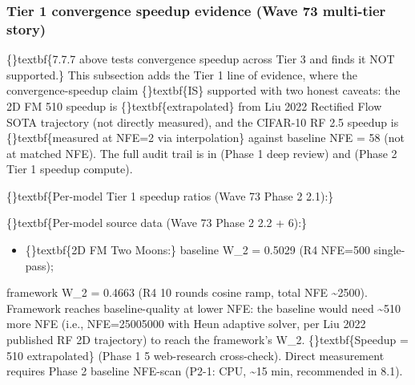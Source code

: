 \documentclass{article}
\begin{document}
\subsubsection{Tier 1 convergence speedup evidence (Wave 73  multi-tier story)}
\{\}textbf\{7.7.7 above tests convergence speedup across Tier 3 and finds it NOT supported.\} This subsection adds the Tier 1 line of evidence, where the convergence-speedup claim \{\}textbf\{IS\} supported  with two honest caveats: the 2D FM 510 speedup is \{\}textbf\{extrapolated\} from Liu 2022 Rectified Flow SOTA trajectory (not directly measured), and the CIFAR-10 RF 2.5 speedup is \{\}textbf\{measured at NFE=2 via interpolation\} against baseline NFE = 58 (not at matched NFE). The full audit trail is in  (Phase 1 deep review) and  (Phase 2 Tier 1 speedup compute).

\{\}textbf\{Per-model Tier 1 speedup ratios (Wave 73 Phase 2 2.1):\}

\begin{table}[ht]
\centering
\small
{}%
\end{table}

\{\}textbf\{Per-model source data (Wave 73 Phase 2 2.2 + 6):\}

\begin{itemize}
\item \{\}textbf\{2D FM Two Moons:\} baseline W\_2 = 0.5029 (R4 NFE=500 single-pass);
\end{itemize}
framework W\_2 = 0.4663 (R4 10 rounds  cosine ramp, total NFE \textasciitilde{}2500). Framework reaches baseline-quality at lower NFE: the baseline would need \textasciitilde{}510 more NFE (i.e., NFE=25005000 with Heun adaptive solver, per Liu 2022 published RF 2D trajectory) to reach the framework's W\_2. \{\}textbf\{Speedup = 510 extrapolated\} (Phase 1 5 web-research cross-check). Direct measurement requires Phase 2 baseline NFE-scan (P2-1: CPU, \textasciitilde{}15 min, recommended in  8.1).
\end{document}
